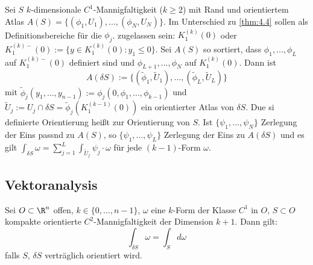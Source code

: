 \begin{theorem}[Definition] \label{thm:8.6}
Sei $S$ $k$-dimensionale $C^1$-Mannigfaltigkeit ($k\ge 2$) mit Rand und orientiertem Atlas $A(S)=\{(\phi_1, U_1), ..., (\phi_N, U_N)\}$. Im Unterschied zu \ref{thm:4.4} sollen als Definitionsbereiche für die $\phi_j$. zugelassen sein: $K_1^(k)(0)$ oder $ K_1^{(k)-}(0):=\{y\in K_1^{(k)}(0):y_1\le 0 \}$. Sei $A(S)$ so sortiert, dass $\phi_1,..., \phi_L$ auf $K_1^{(k)-}(0)$ definiert sind und $\phi_{L+1},..., \phi_N$ auf $K_1^{(k)}(0)$.
Dann ist 
\[
A(\delta S):=\{(\tilde \phi_1, \tilde U_1),...,(\tilde \phi_L, \tilde U_L)\} 
\]
mit $\tilde \phi_j(y_1,..., y_{n-1}):=\phi_j(0, \phi_1,..., \phi_{k-1})$ und $\tilde U_j:= U_j \cap \delta S=\tilde \phi_j(K_1^{(k-1)}(0))$ ein orientierter Atlas von $\delta S$. Due si definierte Orientierung heißt   zur Orientierung von $S$.
Ist $\{\psi_1,..., \psi_N\}$ Zerlegung der Eins passnd zu $A(S)$, so $\{\psi_1,..., \psi_L\}$ Zerlegung der Eins zu $A(\delta S)$ und es gilt $\int_{\delta S}\omega= \sum_{j=1}^L \int_{\tilde U_j} \psi_j \cdot \omega$ für jede $(k-1)$-Form $\omega$.
\end{theorem}

\subsection{Vektoranalysis}
\begin{theorem}
Sei $O\subset \R^n$ offen, $k\in \{0,..., n-1\}$, $\omega$ eine $k$-Form der Klasse $C^1$ in $O$, $S\subset O$ kompakte orientierte $C^2$-Mannigfaltigkeit der Dimension $k+1$. Dann gilt:
\[
\int_{\delta S} \omega=\int_S d\omega
\]
falls $S$, $\delta S$ verträglich orientiert wird.
\end{theorem}

